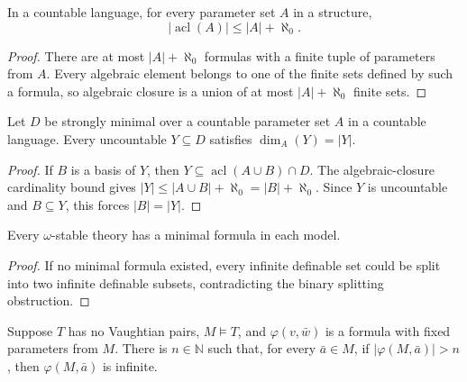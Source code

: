 \begin{lemma}
\label{lem:algebraic-closure-cardinality}
In a countable language, for every parameter set \(A\) in a structure,
\[
  |\operatorname{acl}(A)|\leq |A|+\aleph_0.
\]
\end{lemma}

\begin{proof}
There are at most \(|A|+\aleph_0\) formulas with a finite tuple of
parameters from \(A\).  Every algebraic element belongs to one of the
finite sets defined by such a formula, so algebraic closure is a union
of at most \(|A|+\aleph_0\) finite sets.
\end{proof}

\begin{lemma}
\label{lem:strongly-minimal-uncountable-subset-full-dimension}
Let \(D\) be strongly minimal over a countable parameter set \(A\) in a
countable language.  Every uncountable \(Y\subseteq D\) satisfies
\(\dim_A(Y)=|Y|\).
\end{lemma}

\begin{proof}
If \(B\) is a basis of \(Y\), then
\(Y\subseteq\operatorname{acl}(A\cup B)\cap D\).  The algebraic-closure
cardinality bound gives
\(|Y|\leq|A\cup B|+\aleph_0=|B|+\aleph_0\).  Since \(Y\) is uncountable
and \(B\subseteq Y\), this forces \(|B|=|Y|\).
\end{proof}

\begin{theorem}
\label{thm:omega-stable-has-minimal-formula}
Every \(\omega\)-stable theory has a minimal formula in each model.
\end{theorem}

\begin{proof}
If no minimal formula existed, every infinite definable set could be
split into two infinite definable subsets, contradicting the binary
splitting obstruction.
\end{proof}

\begin{lemma}
\label{lem:finite-bound-without-vaughtian-pairs}
Suppose \(T\) has no Vaughtian pairs, \(M\models T\), and
\(\varphi(v,\bar w)\) is a formula with fixed parameters from \(M\).
There is \(n\in\mathbb N\) such that, for every \(\bar a\in M\), if
\(|\varphi(M,\bar a)|>n\), then \(\varphi(M,\bar a)\) is infinite.
\end{lemma}

